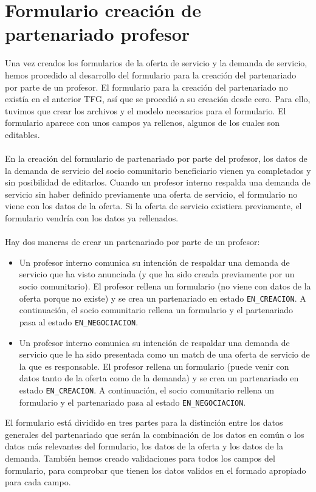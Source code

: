 \documentclass[11pt]{book}
\begin{document}
 \section{Formulario creación de partenariado profesor}
 Una vez creados los formularios de la oferta de servicio y la demanda de servicio, hemos procedido al desarrollo del formulario para la creación del partenariado por parte de un profesor.
 El formulario para la creación del partenariado no existía en el anterior TFG, así que se procedió a su creación desde cero. Para ello, tuvimos que crear los archivos y el modelo necesarios para el formulario. El formulario aparece con unos campos ya rellenos, algunos de los cuales son editables.\\\\
 En la creación del formulario de partenariado por parte del profesor, los datos de la demanda de servicio del socio comunitario beneficiario vienen ya completados y sin posibilidad de editarlos. Cuando un profesor interno respalda una demanda de servicio sin haber definido previamente una oferta de servicio, el formulario no viene con los datos de la oferta. Si la oferta de servicio existiera previamente, el formulario vendría con los datos ya rellenados.\\\\ 
 Hay dos maneras de crear un partenariado por parte de un profesor:
 \begin{itemize}
 	\item Un profesor interno comunica su intención de respaldar una
 	demanda de servicio que ha visto anunciada (y que ha sido creada
 	previamente por un socio comunitario).
 	El profesor rellena un formulario (no viene con datos de la oferta
 	porque no existe) y se crea un partenariado en estado \texttt{EN\_CREACION}.
 	A continuación, el socio comunitario rellena un formulario y el
 	partenariado pasa al estado \texttt{EN\_NEGOCIACION}.
 	\item Un profesor interno comunica su intención de respaldar una
 	demanda de servicio que le ha sido presentada como un match de una
 	oferta de servicio de la que es responsable. El profesor rellena un formulario (puede venir con datos tanto de la oferta como de la demanda) y se crea un partenariado en estado \texttt{EN\_CREACION}. A continuación, el socio comunitario rellena un formulario y el partenariado pasa al estado \texttt{EN\_NEGOCIACION}.\\
 \end{itemize}
 El formulario está dividido en tres partes para la distinción entre los datos generales del partenariado que serán la combinación de los datos en común o los datos más relevantes del formulario, los datos de la oferta y los datos de la demanda. También hemos creado validaciones para todos los campos del formulario, para comprobar que tienen los datos validos en el formado apropiado para cada campo.\\\\
\end{document}
